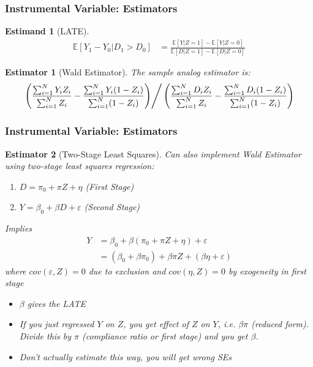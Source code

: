 \documentclass[xcolor=dvipsnames]{beamer}
\newtheorem{estm}{Estimand}
\newtheorem{esti}{Estimator}
\newcommand\E{\mathbb{E}}
\begin{document}
\begin{frame}
  \frametitle{Instrumental Variable: Estimators}
\begin{estm}[LATE]\small
\begin{align*}
\E[Y_1-Y_0|D_1>D_0]
&= \frac{\E[Y|Z=1]-\E[Y|Z=0]}{\E[D|Z=1]-\E[D|Z=0]}
\end{align*}
\end{estm}\vspace{-.2in}
\bigskip
\begin{esti}[Wald Estimator]\small
The sample analog estimator is:
\[
\left.\left(
\frac{\sum_{i=1}^N Y_iZ_i}{\sum_{i=1}^N Z_i}
-
\frac{\sum_{i=1}^N Y_i(1-Z_i)}{\sum_{i=1}^N (1-Z_i)}
\right)\right/
\left(
\frac{\sum_{i=1}^N D_iZ_i}{\sum_{i=1}^N Z_i}
-
\frac{\sum_{i=1}^N D_i(1-Z_i)}{\sum_{i=1}^N(1-Z_i)}
\right)
\]
\end{esti}
\end{frame}

\begin{frame}
  \frametitle{Instrumental Variable: Estimators}
\begin{esti}[Two-Stage Least Squares]\footnotesize
Can also implement Wald Estimator using two-stage least squares regression:
\begin{enumerate}
\item $D=\pi_0 + \pi Z+ \eta$ (First Stage)
\item $Y=\beta_0 +\beta D+\varepsilon$ (Second Stage)
\end{enumerate}
Implies
\begin{align*}
Y &= \beta_0 + \beta (\pi_0 + \pi Z + \eta)  + \varepsilon \\ 
&= (\beta_0 + \beta \pi_0) + \beta \pi Z + (\beta \eta + \varepsilon)
\end{align*}
where $cov(\varepsilon,Z)=0$ due to exclusion and $cov(\eta,Z)=0$ by exogeneity in first stage
\begin{itemize}
\item $\beta$ gives the LATE
\item If you just regressed $Y$ on $Z$, you get effect of $Z$ on $Y$, i.e. $\beta \pi$ (reduced form). Divide this by $\pi$ (compliance ratio or first stage) and you get $\beta$.
\item Don't actually estimate this way, you will get wrong SEs
\end{itemize}

\bigskip
\end{esti}
\end{frame}
\end{document}
